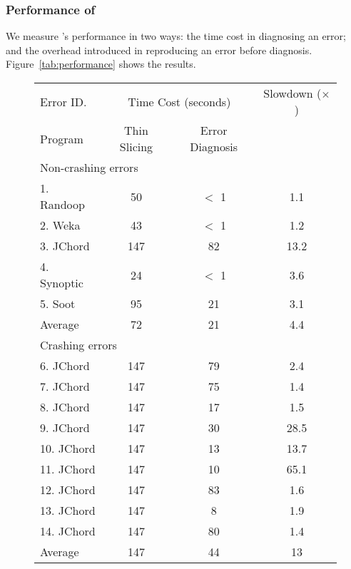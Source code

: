 \subsubsection{Performance of \ourtool}
\label{sec:performance}

We measure \ourtool's performance in two ways: the time cost
in diagnosing an error; and the overhead introduced
in reproducing an error before diagnosis.  Figure~\ref{tab:performance}
shows the results.

\begin{figure}[t]
\setlength{\tabcolsep}{.94\tabcolsep}
\small{
\begin{tabular}{|l|c|c|c|}
\hline
 Error ID. & \multicolumn{2}{|c|}{Time Cost (seconds)} & Slowdown ($\times$)\\
\cline{2-3}
 Program & Thin Slicing & Error Diagnosis &  \\
 \hline
\hline
\multicolumn{4}{|l|}{Non-crashing errors}   \\
 \hline
 1. Randoop & 50 & $<$ 1 & 1.1\\
 2. Weka & 43 & $<$ 1 & 1.2 \\
 3. JChord & 147 & 82 & 13.2\\
 4. Synoptic & 24 & $<$ 1 & 3.6 \\
 5. Soot & 95 & 21 & 3.1 \\
\hline
Average & 72 & 21 & 4.4\\
\hline
\hline
\multicolumn{4}{|l|}{Crashing errors}   \\
\hline
 6. JChord & 147 & 79 & 2.4\\
 7. JChord & 147 & 75 & 1.4\\
 8. JChord & 147 & 17 &1.5\\
 9. JChord & 147 & 30 & 28.5\\
 10. JChord & 147 & 13 &13.7\\
 11. JChord & 147 & 10 &65.1 \\
 12. JChord & 147 & 83 &1.6\\
 13. JChord & 147 & 8 &1.9\\
 14. JChord & 147 & 80 &1.4\\
\hline
Average & 147 & 44 & 13\\
\hline
\end{tabular}
}
\end{figure}

